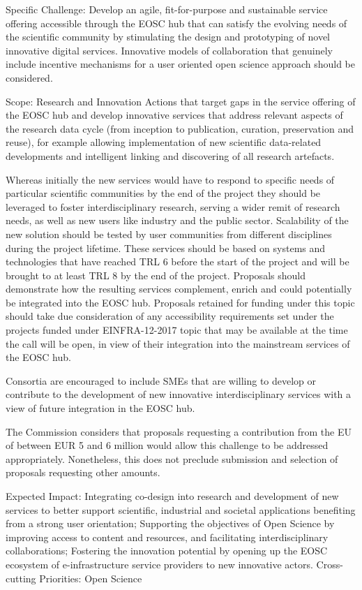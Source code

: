 Specific Challenge:
Develop an agile, fit-for-purpose and sustainable service offering accessible through the EOSC hub that can satisfy the evolving needs of the scientific community by stimulating the design and prototyping of novel innovative digital services. Innovative models of collaboration that genuinely include incentive mechanisms for a user oriented open science approach should be considered.

Scope:
Research and Innovation Actions that target gaps in the service offering of the EOSC hub and develop innovative services that address relevant aspects of the research data cycle (from inception to publication, curation, preservation and reuse), for example allowing implementation of new scientific data-related developments and intelligent linking and discovering of all research artefacts.

Whereas initially the new services would have to respond to specific needs of particular scientific communities by the end of the project they should be leveraged to foster interdisciplinary research, serving a wider remit of research needs, as well as new users like industry and the public sector. Scalability of the new solution should be tested by user communities from different disciplines during the project lifetime. These services should be based on systems and technologies that have reached TRL 6 before the start of the project and will be brought to at least TRL 8 by the end of the project. Proposals should demonstrate how the resulting services complement, enrich and could potentially be integrated into the EOSC hub. Proposals retained for funding under this topic should take due consideration of any accessibility requirements set under the projects funded under EINFRA-12-2017 topic that may be available at the time the call will be open, in view of their integration into the mainstream services of the EOSC hub.

Consortia are encouraged to include SMEs that are willing to develop or contribute to the development of new innovative interdisciplinary services with a view of future integration in the EOSC hub.

The Commission considers that proposals requesting a contribution from the EU of between EUR 5 and 6 million would allow this challenge to be addressed appropriately. Nonetheless, this does not preclude submission and selection of proposals requesting other amounts.

Expected Impact:
Integrating co-design into research and development of new services to better support scientific, industrial and societal applications benefiting from a strong user orientation;
Supporting the objectives of Open Science by improving access to content and resources, and facilitating interdisciplinary collaborations;
Fostering the innovation potential by opening up the EOSC ecosystem of e-infrastructure service providers to new innovative actors.
Cross-cutting Priorities:
Open Science
